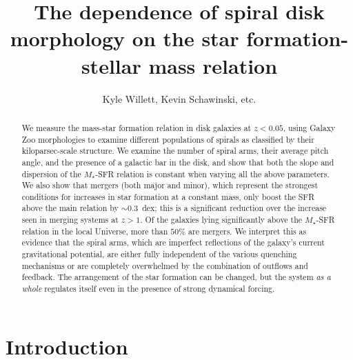 \documentclass{emulateapj}
\begin{document}
\title{The dependence of spiral disk morphology on the star formation-stellar mass relation}

\author{Kyle Willett, Kevin Schawinski, etc.}





\begin{abstract}
We measure the mass-star formation relation in disk galaxies at $z<0.05$, using Galaxy Zoo morphologies to examine different populations of spirals as classified by their kiloparsec-scale structure. We examine the number of spiral arms, their average pitch angle, and the presence of a galactic bar in the disk, and show that both the slope and dispersion of the $M_\star$-SFR relation is constant when varying all the above parameters. We also show that mergers (both major and minor), which represent the strongest conditions for increases in star formation at a constant mass, only boost the SFR above the main relation by $\sim0.3$~dex; this is a significant reduction over the increase seen in merging systems at $z>1$. Of the galaxies lying significantly above the $M_\star$-SFR relation in the local Universe, more than $50\%$ are mergers. We interpret this as evidence that the spiral arms, which are imperfect reflections of the galaxy's current gravitational potential, are either fully independent of the various quenching mechanisms or are completely overwhelmed by the combination of outflows and feedback. The arrangement of the star formation can be changed, but the system \emph{as a whole} regulates itself even in the presence of strong dynamical forcing. 
\end{abstract}



\section{Introduction} \label{sec-intro}
\end{document}
